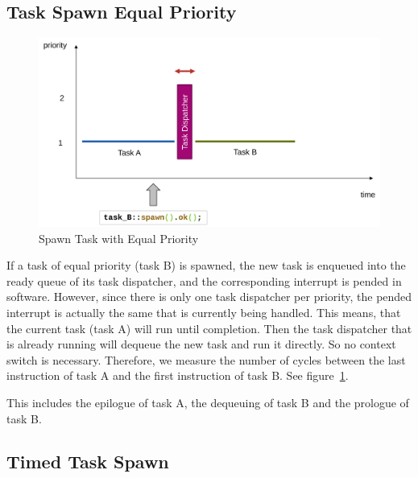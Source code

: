 \subsection{Task Spawn Equal Priority}

\begin{figure}
  \centerfloat
  \includegraphics[width=\textwidth]{fig/spawn_prio_equal.svg.pdf}
  \caption{Spawn Task with Equal Priority}%
  \label{fig:spawn_prio_equal}
\end{figure}

If a task of equal priority (task B) is spawned, the new task is enqueued into the ready queue of its task dispatcher, and the corresponding interrupt is pended in software. However, since there is only one task dispatcher per priority, the pended interrupt is actually the same that is currently being handled. This means, that the current task (task A) will run until completion. Then the task dispatcher that is already running will dequeue the new task and run it directly. So no context switch is necessary. Therefore, we measure the number of cycles between the last instruction of task A and the first instruction of task B. See figure~\ref{fig:spawn_prio_equal}.

This includes the epilogue of task A, the dequeuing of task B and the prologue of task B.

\subsection{Timed Task Spawn}

